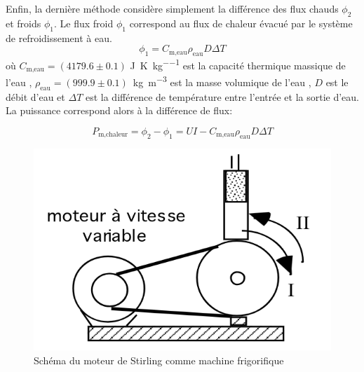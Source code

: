 Enfin, la dernière méthode considère simplement la différence des flux chauds \(\phi_2\) et froids \(\phi_1\). Le flux froid \(\phi_1\) correspond au flux de chaleur évacué par le système de refroidissement à eau.
\begin{equation}
    \phi_1 = C_\textrm{m,eau} \rho_\textrm{eau} D \Delta T
\end{equation}
où \(C_\textrm{m,eau} = (4179.6 \pm 0.1)\) \si{\joule\per\kelvin\per\kilo\gram} est la capacité thermique massique de l'eau \cite{proprietes-eau}, \mbox{\(\rho_\textrm{eau} = (999.9 \pm 0.1)\) \si{\kilo\gram\per\meter\cubed}} est la masse volumique de l'eau \cite{proprietes-eau}, \(D\) est le débit d'eau et \(\Delta T\) est la différence de température entre l'entrée et la sortie d'eau. La puissance correspond alors à la différence de flux:

\begin{equation}
    P_\textrm{m,chaleur} = \phi_2 - \phi_1 = UI - C_\textrm{m,eau} \rho_\textrm{eau} D \Delta T
    \label{eq:pm_chaleur}
\end{equation}

\begin{figure}
    \centering
    \vspace{-1cm}
    \includegraphics[width=\linewidth]{figures/machine-frigo.png}
    \caption{Schéma du moteur de Stirling comme machine frigorifique \cite{notice}}
    \label{fig:machine_frigo}
    \vspace{-0.5cm}
\end{figure}

